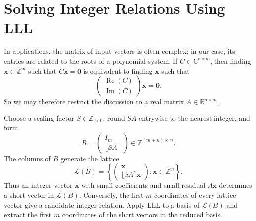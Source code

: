 \documentclass{weeklyprogress}
\begin{document}
\clearpage

\section{Solving Integer Relations Using LLL}

In applications, the matrix of input vectors is often complex; in our case, its entries are related to the roots of a polynomial system. If $C\in\mathbb{C}^{r\times m}$, then finding $\bm{x}\in\mathbb{Z}^m$ such that $C\bm{x}=\bm{0}$ is equivalent to finding $\bm{x}$ such that
\[ \begin{pmatrix} \operatorname{Re}(C) \\ \operatorname{Im}(C) \end{pmatrix}\bm{x}=\bm{0}. \]
So we may therefore restrict the discussion to a real matrix $A\in\mathbb{R}^{n\times m}$.

Choose a scaling factor $S\in\mathbb{Z}_{>0}$, round $SA$ entrywise to the nearest integer, and form
\[ B=\begin{pmatrix} I_m \\ \lfloor SA\rceil \end{pmatrix}\in\mathbb{Z}^{(m+n)\times m}. \]
The columns of $B$ generate the lattice
\[ \mathcal{L}(B)=\left\{\begin{pmatrix}\bm{x}\\\lfloor SA\rceil\bm{x}\end{pmatrix}:\bm{x}\in\mathbb{Z}^m\right\}. \]
Thus an integer vector $\bm{x}$ with small coefficients and small residual $A\bm{x}$ determines a short vector in $\mathcal{L}(B)$. Conversely, the first $m$ coordinates of every lattice vector give a candidate integer relation. Apply LLL to a basis of $\mathcal{L}(B)$ and extract the first $m$ coordinates of the short vectors in the reduced basis.
\end{document}
